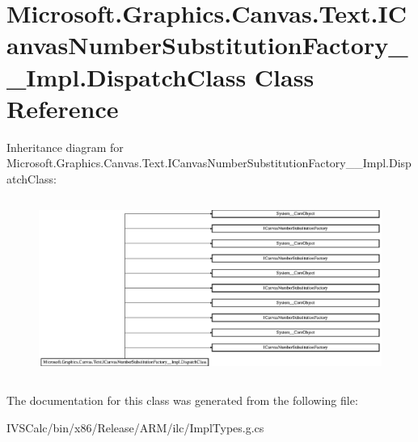 \hypertarget{class_microsoft_1_1_graphics_1_1_canvas_1_1_text_1_1_i_canvas_number_substitution_factory_____impl_1_1_dispatch_class}{}\section{Microsoft.\+Graphics.\+Canvas.\+Text.\+I\+Canvas\+Number\+Substitution\+Factory\+\_\+\+\_\+\+Impl.\+Dispatch\+Class Class Reference}
\label{class_microsoft_1_1_graphics_1_1_canvas_1_1_text_1_1_i_canvas_number_substitution_factory_____impl_1_1_dispatch_class}
Inheritance diagram for Microsoft.\+Graphics.\+Canvas.\+Text.\+I\+Canvas\+Number\+Substitution\+Factory\+\_\+\+\_\+\+Impl.\+Dispatch\+Class\+:\begin{figure}[H]
\begin{center}
\leavevmode
\includegraphics[height=5.877862cm]{class_microsoft_1_1_graphics_1_1_canvas_1_1_text_1_1_i_canvas_number_substitution_factory_____impl_1_1_dispatch_class}
\end{center}
\end{figure}


The documentation for this class was generated from the following file\+:\begin{DoxyCompactItemize}
\item 
I\+V\+S\+Calc/bin/x86/\+Release/\+A\+R\+M/ilc/Impl\+Types.\+g.\+cs\end{DoxyCompactItemize}
